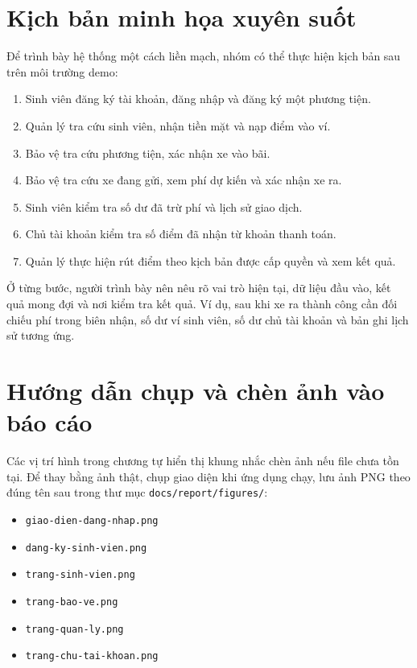 \section{Kịch bản minh họa xuyên suốt}

Để trình bày hệ thống một cách liền mạch, nhóm có thể thực hiện kịch bản sau trên môi trường demo:
\begin{enumerate}[label=\arabic*)]
    \item Sinh viên đăng ký tài khoản, đăng nhập và đăng ký một phương tiện.
    \item Quản lý tra cứu sinh viên, nhận tiền mặt và nạp điểm vào ví.
    \item Bảo vệ tra cứu phương tiện, xác nhận xe vào bãi.
    \item Bảo vệ tra cứu xe đang gửi, xem phí dự kiến và xác nhận xe ra.
    \item Sinh viên kiểm tra số dư đã trừ phí và lịch sử giao dịch.
    \item Chủ tài khoản kiểm tra số điểm đã nhận từ khoản thanh toán.
    \item Quản lý thực hiện rút điểm theo kịch bản được cấp quyền và xem kết quả.
\end{enumerate}

Ở từng bước, người trình bày nên nêu rõ vai trò hiện tại, dữ liệu đầu vào, kết quả mong đợi và nơi kiểm tra kết quả. Ví dụ, sau khi xe ra thành công cần đối chiếu phí trong biên nhận, số dư ví sinh viên, số dư chủ tài khoản và bản ghi lịch sử tương ứng.

\section{Hướng dẫn chụp và chèn ảnh vào báo cáo}

Các vị trí hình trong chương tự hiển thị khung nhắc chèn ảnh nếu file chưa tồn tại. Để thay bằng ảnh thật, chụp giao diện khi ứng dụng chạy, lưu ảnh PNG theo đúng tên sau trong thư mục \texttt{docs/report/figures/}:
\begin{itemize}
    \item \texttt{giao-dien-dang-nhap.png}
    \item \texttt{dang-ky-sinh-vien.png}
    \item \texttt{trang-sinh-vien.png}
    \item \texttt{trang-bao-ve.png}
    \item \texttt{trang-quan-ly.png}
    \item \texttt{trang-chu-tai-khoan.png}
\end{itemize}

